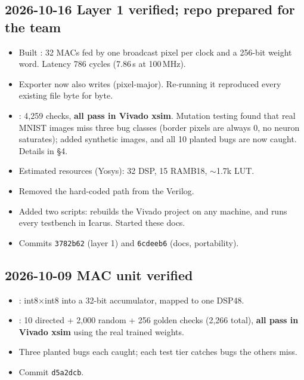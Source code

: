 \documentclass[11pt]{article}
\begin{document}
\subsection*{2026-10-16 \quad Layer 1 verified; repo prepared for the team}
\begin{itemize}
  \item Built : 32 MACs fed by one broadcast pixel per clock and a
        256-bit weight word. Latency 786 cycles (7.86\,\textmu s at 100\,MHz).
  \item Exporter now also writes  (pixel-major). Re-running it
        reproduced every existing file byte for byte.
  \item {}: 4{,}259 checks, \textbf{all pass in Vivado xsim}.
        Mutation testing found that real MNIST images miss three bug classes
        (border pixels are always 0, no neuron saturates); added synthetic images, and
        all 10 planted bugs are now caught. Details in  \S4.
  \item Estimated resources (Yosys): 32 DSP, 15 RAMB18, $\sim$1.7k LUT.
  \item Removed the hard-coded  path from the Verilog.
  \item Added two scripts:  rebuilds the Vivado project on
        any machine, and  runs every testbench in Icarus.
        Started these docs.
  \item Commits \texttt{3782b62} (layer 1) and \texttt{6cdeeb6} (docs, portability).
\end{itemize}

\subsection*{2026-10-09 \quad MAC unit verified}
\begin{itemize}
  \item {}: int8$\times$int8 into a 32-bit accumulator, mapped to one DSP48.
  \item {}: 10 directed + 2{,}000 random + 256 golden checks
        (2{,}266 total), \textbf{all pass in Vivado xsim} using the real trained weights.
  \item Three planted bugs each caught; each test tier catches bugs the others miss.
  \item Commit \texttt{d5a2dcb}.
\end{itemize}
\end{document}
